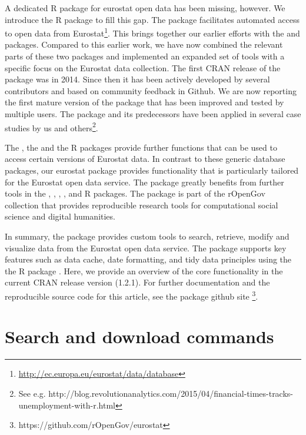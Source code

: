 A dedicated R package for eurostat open data has been missing,
however. We introduce the  R package to fill this
gap. The package facilitates automated access to open data from
Eurostat\footnote{\url{http://ec.europa.eu/eurostat/data/database}}.
This brings together our earlier efforts with
the  \citep{statfi} and 
\citep{smarterpoland} packages. Compared to this earlier work, we have now combined the
relevant parts of these two packages and implemented an expanded set
of tools with a specific focus on the Eurostat data collection. The
first CRAN release of the package was in 2014. Since then it has been
actively developed by several contributors and based on community
feedback in Github. We are now reporting the first mature version of
the package that has been improved and tested by multiple users. The
package and its predecessors have been applied in several case studies
by us and others\footnote{See
e.g. http://blog.revolutionanalytics.com/2015/04/financial-times-tracks-unemployment-with-r.html}.

The  \citep{datamart}, the  \citep{quandl} and
the  \citep{pdfetch} 
R packages provide further functions that can be used to access
certain versions of Eurostat data. In contrast to these generic
database packages, our eurostat package provides functionality that is
particularly tailored for the Eurostat open data service.
The  package greatly benefits from further tools in
the
 \citep{dplyr},
 \citep{knitr},  \citep{ggplot2},
 \citep{mapproj}, and
 \citep{stringi} R packages. The  package is
part of the rOpenGov collection
\citep{Lahti13icml} that provides reproducible research tools for
computational social science and digital humanities.

In summary, the  package provides custom tools to
search, retrieve, modify and visualize data from the Eurostat open
data service. The package supports key features such as data cache,
date formatting, and tidy data principles \citep{wickham2014} using
the the  R package \citep{tidyr}. Here, we provide an
overview of the core functionality in the current CRAN release version
(1.2.1). For further documentation and the reproducible source code
for this article, see the package github
site \footnote{https://github.com/rOpenGov/eurostat}.


\section{Search and download commands}

